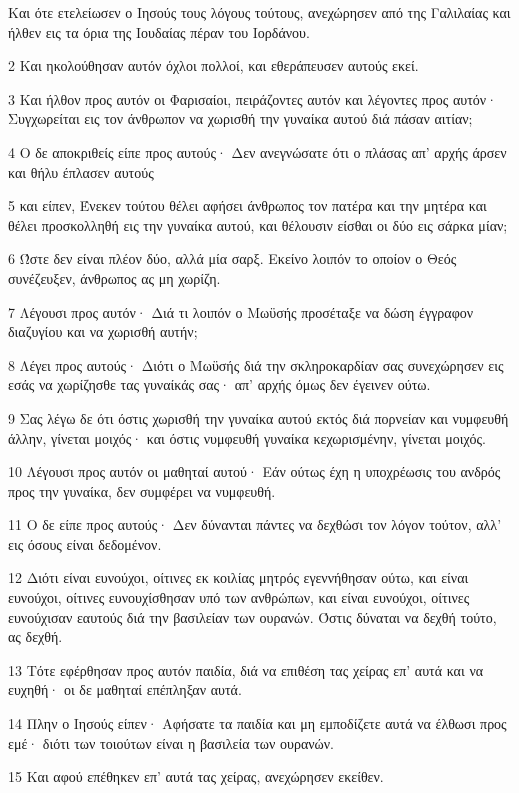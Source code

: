 \par Και ότε ετελείωσεν ο Ιησούς τους λόγους τούτους, ανεχώρησεν από της Γαλιλαίας και ήλθεν εις τα όρια της Ιουδαίας πέραν του Ιορδάνου.
\par 2 Και ηκολούθησαν αυτόν όχλοι πολλοί, και εθεράπευσεν αυτούς εκεί.
\par 3 Και ήλθον προς αυτόν οι Φαρισαίοι, πειράζοντες αυτόν και λέγοντες προς αυτόν· Συγχωρείται εις τον άνθρωπον να χωρισθή την γυναίκα αυτού διά πάσαν αιτίαν;
\par 4 Ο δε αποκριθείς είπε προς αυτούς· Δεν ανεγνώσατε ότι ο πλάσας απ' αρχής άρσεν και θήλυ έπλασεν αυτούς
\par 5 και είπεν, Ένεκεν τούτου θέλει αφήσει άνθρωπος τον πατέρα και την μητέρα και θέλει προσκολληθή εις την γυναίκα αυτού, και θέλουσιν είσθαι οι δύο εις σάρκα μίαν;
\par 6 Ώστε δεν είναι πλέον δύο, αλλά μία σαρξ. Εκείνο λοιπόν το οποίον ο Θεός συνέζευξεν, άνθρωπος ας μη χωρίζη.
\par 7 Λέγουσι προς αυτόν· Διά τι λοιπόν ο Μωϋσής προσέταξε να δώση έγγραφον διαζυγίου και να χωρισθή αυτήν;
\par 8 Λέγει προς αυτούς· Διότι ο Μωϋσής διά την σκληροκαρδίαν σας συνεχώρησεν εις εσάς να χωρίζησθε τας γυναίκάς σας· απ' αρχής όμως δεν έγεινεν ούτω.
\par 9 Σας λέγω δε ότι όστις χωρισθή την γυναίκα αυτού εκτός διά πορνείαν και νυμφευθή άλλην, γίνεται μοιχός· και όστις νυμφευθή γυναίκα κεχωρισμένην, γίνεται μοιχός.
\par 10 Λέγουσι προς αυτόν οι μαθηταί αυτού· Εάν ούτως έχη η υποχρέωσις του ανδρός προς την γυναίκα, δεν συμφέρει να νυμφευθή.
\par 11 Ο δε είπε προς αυτούς· Δεν δύνανται πάντες να δεχθώσι τον λόγον τούτον, αλλ' εις όσους είναι δεδομένον.
\par 12 Διότι είναι ευνούχοι, οίτινες εκ κοιλίας μητρός εγεννήθησαν ούτω, και είναι ευνούχοι, οίτινες ευνουχίσθησαν υπό των ανθρώπων, και είναι ευνούχοι, οίτινες ευνούχισαν εαυτούς διά την βασιλείαν των ουρανών. Όστις δύναται να δεχθή τούτο, ας δεχθή.
\par 13 Τότε εφέρθησαν προς αυτόν παιδία, διά να επιθέση τας χείρας επ' αυτά και να ευχηθή· οι δε μαθηταί επέπληξαν αυτά.
\par 14 Πλην ο Ιησούς είπεν· Αφήσατε τα παιδία και μη εμποδίζετε αυτά να έλθωσι προς εμέ· διότι των τοιούτων είναι η βασιλεία των ουρανών.
\par 15 Και αφού επέθηκεν επ' αυτά τας χείρας, ανεχώρησεν εκείθεν.

